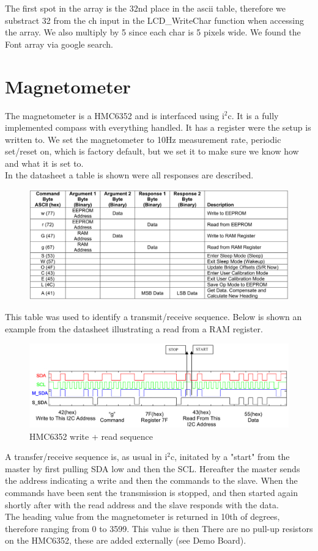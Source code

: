 The first spot in the array is the 32nd place in the ascii table, therefore we substract 32 from the ch input in the LCD\_WriteChar function when accessing the array. We also multiply by 5 since each char is 5 pixels wide. We found the Font array via google search.

\section{Magnetometer}
The magnetometer is a HMC6352 and is interfaced using i$^2$c. It is a fully implemented compass with everything handled. It has a register were the setup is written to. We set the magnetometer to 10Hz measurement rate, periodic set/reset on, which is factory default, but we set it to make sure we know how and what it is set to.\\
In the datasheet a table is shown were all responses are described.

\begin{figure}[H]
\centering
\includegraphics[width=.9\textwidth]{billeder/HMC6352_responses}
\end{figure}

This table was used to identify a transmit/receive sequence. Below is shown an example from the datasheet illustrating a read from a RAM register.

\begin{figure}[H]
\centering
\includegraphics[width=.8\textwidth]{billeder/HMC6352_example}
\caption{HMC6352 write + read sequence}
\end{figure}

A transfer/receive sequence is, as usual in i$^2$c, initated by a "start" from the master by first pulling SDA low and then the SCL. Hereafter the master sends the address indicating a write and then the commands to the slave. When the commands have been sent the transmission is stopped, and then started again shortly after with the read address and the slave responds with the data.\\
The heading value from the magnetometer is returned in 10th of degrees, therefore ranging from 0 to 3599. This value is then
There are no pull-up resistors on the HMC6352, these are added externally (see Demo Board).\\

